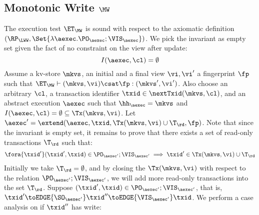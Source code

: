 \subsection{Monotonic Write \( \MW \)}
\label{sec:sound-complete-mw}

The execution test $\ET_\MW$ is sound with respect to the axiomatic definition 
$(\RP_{\LWW}, \Set{\lambda \aexec. \PO_{\aexec} ; \VIS_{\aexec} })$.
We pick the invariant as empty set given the fact of no constraint on the view after update:
\[ 
    I( \aexec, \cl ) = \emptyset 
\]
Assume a kv-store $\mkvs$, an initial and a final view $\vi, \vi'$  a fingerprint $\fp$ 
such that $\ET_{\MW} \vdash (\mkvs, \vi) \csat \fp: (\mkvs',\vi')$. 
Also choose an arbitrary $\cl$, a transaction identifier $\txid \in \nextTxid(\mkvs, \cl)$, 
and an abstract execution $\aexec$ such that $\hh_{\aexec} = \mkvs$ and 
\( I(\aexec, \cl) =  \emptyset \subseteq \Tx(\mkvs, \vi) \).
Let \( \aexec' = \extend(\aexec, \txid, \Tx(\mkvs, \vi) \cup \T_\rd, \fp ) \).
Note that since the invariant  is empty set, it remains to prove that there exists a set of read-only transactions \( \T_\rd \) such that:
\[
    \begin{array}{@{}l@{}}
        \fora{ \txid' }  (\txid' ,\txid)  \in \PO_{\aexec'} ; \VIS_{\aexec'}
        \implies \txid' \in \Tx(\mkvs, \vi) \cup \T_\rd
    \end{array}
\]
Initially we take \( \T_\rd = \emptyset \), 
and by closing the \( \Tx(\mkvs, \vi) \) with respect to the relation \( \PO_{\aexec'} ; \VIS_{\aexec'} \),
we will add more read-only transactions into the set \( \T_\rd\).
Suppose \( (\txid' ,\txid)  \in \PO_{\aexec'} ; \VIS_{\aexec'} \), 
that is, \( \txid' \toEDGE{\SO_{\aexec'}} \txid'' \toEDGE{\VIS_{\aexec'}} \txid \).
We perform a case analysis on if \( \txid'' \) has write:
